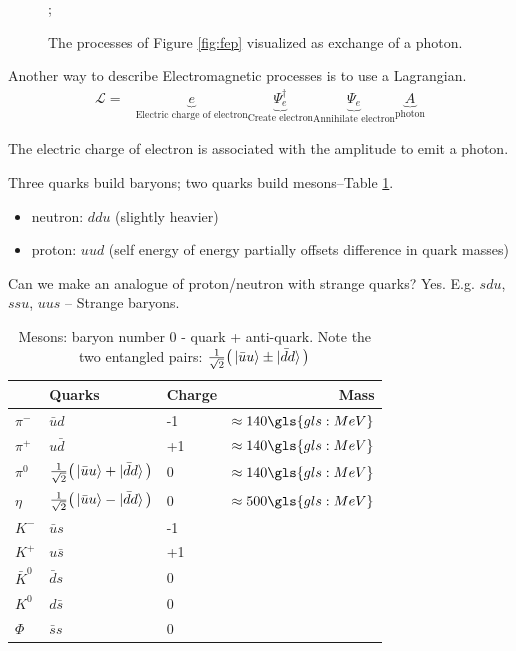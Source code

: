 \documentclass[]{article}
\begin{document}
\begin{figure}[H]
	\begin{center}
		\caption{The processes of Figure \ref{fig:fep} visualized as exchange of a photon.}\label{fig:fep2}
		;
	\end{center}
\end{figure}

Another way to describe Electromagnetic processes is to use a Lagrangian.
\begin{align*}
	\mathcal{L} =& \underbrace{e}_\text{Electric charge of electron} \underbrace{\Psi_e^\dagger}_\text{Create electron} \underbrace{\Psi_e}_\text{Annihilate electron} \underbrace{A}_\text{photon}
\end{align*}

The electric charge of electron is associated with the amplitude to emit a photon.


Three quarks build baryons; two quarks build mesons--Table \ref{table:mesons}.
\begin{itemize}
	\item neutron: $ddu$ (slightly heavier)
	\item proton: $uud$ (self energy of energy partially offsets difference in quark masses)
\end{itemize}

Can we make an analogue of proton/neutron with strange quarks? Yes. E.g. $sdu$, $ssu$, $uus$ -- Strange baryons.


\begin{table}[H]
	\begin{center}
		\caption[Mesons: baryon number 0 - quark + anti-quark]{Mesons: baryon number 0 - quark + anti-quark. Note the two entangled pairs: $\frac{1}{\sqrt{2}}\big(\ket{\bar{u}u}\pm\ket{\bar{d}d}\big)$}\label{table:mesons}
		\begin{tabular}{|l|l|l|r|} \hline
			&Quarks&Charge&Mass\\ \hline
			$\pi^-$&$\bar{u}d$&-1&$\approx140 \gls{gls:MeV}$ \\ \hline
			$\pi^+$&$u\bar{d}$&+1&$\approx140 \gls{gls:MeV}$  \\ \hline
			$\pi^0$&$\frac{1}{\sqrt{2}}\big(\ket{\bar{u}u}+\ket{\bar{d}d}\big)$&0&$\approx140 \gls{gls:MeV}$  \\ \hline
			$\eta$&$\frac{1}{\sqrt{2}}\big(\ket{\bar{u}u}-\ket{\bar{d}d}\big)$& 0&$\approx500 \gls{gls:MeV}$ \\ \hline
			$K^-$&$\bar{u}s$&-1& \\ \hline
			$K^+$&$u\bar{s}$&+1& \\ \hline
			$\bar{K}^0$&$\bar{d}s$&0& \\ \hline
			$K^0$&$d\bar{s}$&0& \\ \hline
			$\Phi$&$\bar{s}s$&0& \\ \hline
		\end{tabular}
	\end{center}
\end{table}
\end{document}
